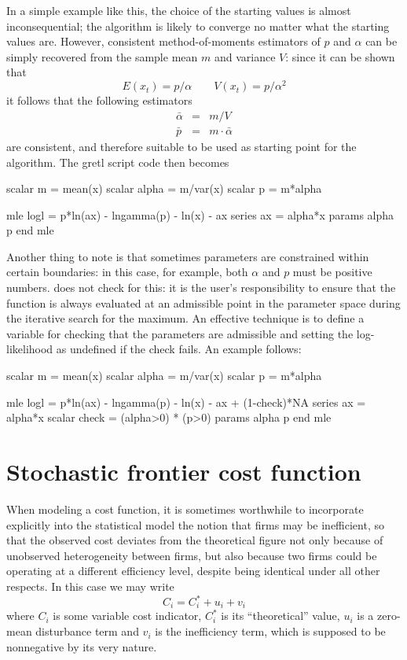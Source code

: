 In a simple example like this, the choice of the starting values is
almost inconsequential; the algorithm is likely to converge no
matter what the starting values are. However, consistent
method-of-moments estimators of $p$ and $\alpha$ can be simply
recovered from the sample mean $m$ and variance $V$: since it can be
shown that
\[
  E(x_t) = p/\alpha \qquad  V(x_t) = p/\alpha^2
\]
it follows that the following estimators 
\begin{eqnarray*}
  \bar{\alpha} & = &  m/V \\
  \bar{p} & = & m \cdot \bar{\alpha} 
\end{eqnarray*}
are consistent, and therefore suitable to be used as starting point
for the algorithm.  The gretl script code then becomes
\begin{code}
    scalar m = mean(x)
    scalar alpha = m/var(x)
    scalar p = m*alpha

    mle logl =  p*ln(ax) - lngamma(p) - ln(x) - ax 
    series ax = alpha*x
    params alpha p
    end mle 
\end{code}

Another thing to note is that sometimes parameters are constrained
within certain boundaries: in this case, for example, both $\alpha$
and $p$ must be positive numbers.  does not check for this:
it is the user's responsibility to ensure that the function is
always evaluated at an admissible point in the parameter space during
the iterative search for the maximum. An effective technique is to
define a variable for checking that the parameters are admissible and
setting the log-likelihood as undefined if the check fails. An example
follows:
\begin{code}
    scalar m = mean(x)
    scalar alpha = m/var(x)
    scalar p = m*alpha

    mle logl =  p*ln(ax) - lngamma(p) - ln(x) - ax + (1-check)*NA
    series ax = alpha*x
    scalar check = (alpha>0) * (p>0)
    params alpha p
    end mle 
\end{code}

\section{Stochastic frontier cost function}
\label{sec:frontier}

When modeling a cost function, it is sometimes worthwhile to
incorporate explicitly into the statistical model the notion that
firms may be inefficient, so that the observed cost deviates from the
theoretical figure not only because of unobserved heterogeneity
between firms, but also because two firms could be operating at a
different efficiency level, despite being identical under all other
respects. In this case we may write
\[
  C_i = C^*_i + u_i + v_i
\]
where $C_i$ is some variable cost indicator, $C_i^*$ is its
``theoretical'' value, $u_i$ is a zero-mean disturbance term and
$v_i$ is the inefficiency term, which is supposed to be nonnegative
by its very nature.

